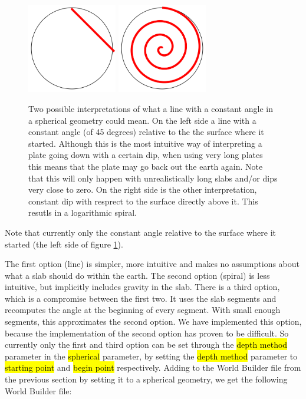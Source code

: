 \documentclass{book}
\newcommand{\WB}{{World Builder}}
\begin{document}
\begin{figure}
    \centering
    \includegraphics[width=0.35\textwidth]{spherical_approximations_line}
    \includegraphics[width=0.35\textwidth]{spherical_approximations_spiral}
    \caption{Two possible interpretations of what a line with a constant angle in a spherical geometry could mean. On the left side a line with a constant angle (of 45 degrees) relative to the the surface where it started. Although this is the most intuitive way of interpreting a plate going down with a certain dip, when using very long plates this means that the plate may go back out the earth again. Note that this will only happen with unrealistically long slabs and/or dips very close to zero. On the right side is the other interpretation, constant dip with resprect to the surface directly above it. This resutls in a logarithmic spiral.}
    \label{fig:coordinate_systems_line_spiral}
\end{figure}

\begin{remark}
Note that currently only the constant angle relative to the surface where it started (the left side of figure \ref{fig:coordinate_systems_line_spiral}).
\end{remark}

The first option (line) is simpler, more intuitive and makes no assumptions about what a slab should do within the earth. The second option (spiral) is less intuitive, but implicitly includes gravity in the slab. There is a third option, which is a compromise between the first two. It uses the slab segments and recomputes the angle at the beginning of every segment. With small enough segments, this approximates the second option. We have implemented this option, because the implementation of the second option has proven to be difficult. So currently only the first and third option can be set through the \hl{depth method} parameter in the \hl{spherical} parameter, by setting the \hl{depth method} parameter to \hl{starting point} and \hl{begin point} respectively. Adding to the \WB{} file from the previous section by setting it to a spherical geometry, we get the following \WB{} file:
\end{document}
